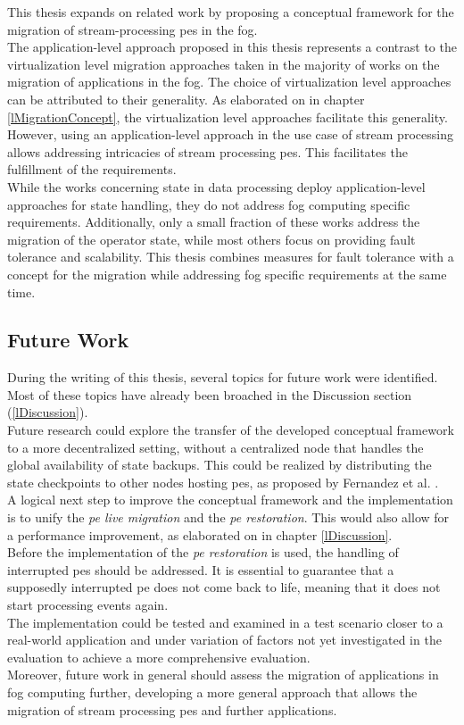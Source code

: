 This thesis expands on related work by proposing a conceptual framework for the migration of stream-processing \gls{pe}s in the fog.\\
The application-level approach proposed in this thesis represents a contrast to the virtualization level migration approaches taken in the majority of works on the migration of applications in the fog. The choice of virtualization level approaches can be attributed to their generality. As elaborated on in chapter \ref{lMigrationConcept}, the virtualization level approaches facilitate this generality. However, using an application-level approach in the use case of stream processing allows addressing intricacies of stream processing \gls{pe}s. This facilitates the fulfillment of the requirements.\\
While the works concerning state in data processing deploy application-level approaches for state handling, they do not address fog computing specific requirements. Additionally, only a small fraction of these works address the migration of the operator state, while most others focus on providing fault tolerance and scalability. This thesis combines measures for fault tolerance with a concept for the migration while addressing fog specific requirements at the same time.



\subsection{Future Work}
\label{lFutureWork}

During the writing of this thesis, several topics for future work were identified. Most of these topics have already been broached in the Discussion section (\ref{lDiscussion}).\\
Future research could explore the transfer of the developed conceptual framework to a more decentralized setting, without a centralized node that handles the global availability of state backups. This could be realized by distributing the state checkpoints to other nodes hosting \gls{pe}s, as proposed by Fernandez et al. \cite{CastroFernandez.2013}.\\
A logical next step to improve the conceptual framework and the implementation is to unify the \textit{\acrshort{pe} live migration} and the \textit{\acrshort{pe} restoration}. This would also allow for a performance improvement, as elaborated on in chapter \ref{lDiscussion}.\\
Before the implementation of the \textit{\acrshort{pe} restoration} is used, the handling of interrupted \gls{pe}s should be addressed. It is essential to guarantee that a supposedly interrupted \gls{pe} does not come back to life, meaning that it does not start processing events again.\\
The implementation could be tested and examined in a test scenario closer to a real-world application and under variation of factors not yet investigated in the evaluation to achieve a more comprehensive evaluation.\\
Moreover, future work in general should assess the migration of applications in fog computing further, developing a more general approach that allows the migration of stream processing \gls{pe}s and further applications.